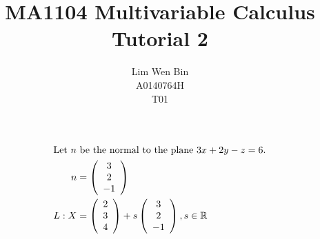\documentclass[12pt]{article}
\newenvironment{problem}[2][Problem]{\begin{trivlist}
\item[\hskip \labelsep {\bfseries #1}\hskip \labelsep {\bfseries #2.}]}{\end{trivlist}}
\begin{document}
\title{MA1104 Multivariable Calculus Tutorial 2}
\author{Lim Wen Bin \\
A0140764H\\
T01}
\maketitle

\begin{problem}{1}
\end{problem}
\begin{align*}
\intertext{Let $n$ be the normal to the plane $3x + 2y -z = 6$.}
n &= \left( \begin{array}{c}
	3\\
	2\\
	-1\\
\end{array} \right) \\
L : X
&=
\left( \begin{array}{c}
	2\\
	3\\
	4\\
\end{array} \right)
+ s
\left( \begin{array}{c}
	3\\
	2\\
	-1\\
\end{array} \right)
, 
s \in \mathbb{R}
\end{align*}
\filbreak
\end{document}
